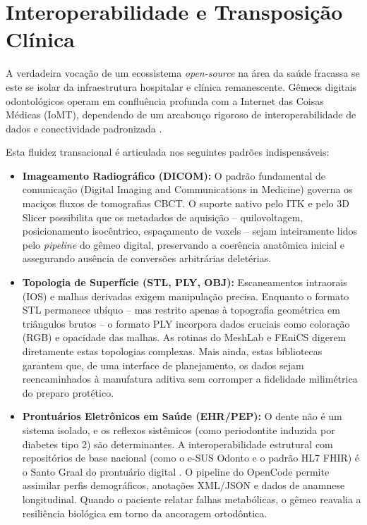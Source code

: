 \section{Interoperabilidade e Transposição Clínica}

A verdadeira vocação de um ecossistema \textit{open-source} na área da saúde fracassa se este se isolar da infraestrutura hospitalar e clínica remanescente. Gêmeos digitais odontológicos operam em confluência profunda com a Internet das Coisas Médicas (IoMT), dependendo de um arcabouço rigoroso de interoperabilidade de dados e conectividade padronizada \cite{digital2025convergence}. 

Esta fluidez transacional é articulada nos seguintes padrões indispensáveis:

\begin{itemize}
    \item \textbf{Imageamento Radiográfico (DICOM):} O padrão fundamental de comunicação (Digital Imaging and Communications in Medicine) governa os maciços fluxos de tomografias CBCT. O suporte nativo pelo ITK e pelo 3D Slicer possibilita que os metadados de aquisição -- quilovoltagem, posicionamento isocêntrico, espaçamento de voxels -- sejam inteiramente lidos pelo \textit{pipeline} do gêmeo digital, preservando a coerência anatômica inicial e assegurando ausência de conversões arbitrárias deletérias.

    \item \textbf{Topologia de Superfície (STL, PLY, OBJ):} Escaneamentos intraorais (IOS) e malhas derivadas exigem manipulação precisa. Enquanto o formato STL permanece ubíquo -- mas restrito apenas à topografia geométrica em triângulos brutos -- o formato PLY incorpora dados cruciais como coloração (RGB) e opacidade das malhas. As rotinas do MeshLab e FEniCS digerem diretamente estas topologias complexas. Mais ainda, estas bibliotecas garantem que, de uma interface de planejamento, os dados sejam reencaminhados à manufatura aditiva sem corromper a fidelidade milimétrica do preparo protético.

    \item \textbf{Prontuários Eletrônicos em Saúde (EHR/PEP):} O dente não é um sistema isolado, e os reflexos sistêmicos (como periodontite induzida por diabetes tipo 2) são determinantes. A interoperabilidade estrutural com repositórios de base nacional (como o e-SUS Odonto e o padrão HL7 FHIR) é o Santo Graal do prontuário digital \cite{frota2025sus}. O pipeline do OpenCode permite assimilar perfis demográficos, anotações XML/JSON e dados de anamnese longitudinal. Quando o paciente relatar falhas metabólicas, o gêmeo reavalia a resiliência biológica em torno da ancoragem ortodôntica.


\end{itemize}
